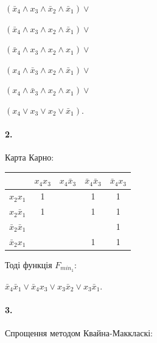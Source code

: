 \documentclass[12pt]{extarticle}
\begin{document}
$( \bar x_4 \land x_3 \land \bar x_2 \land \bar x_1) \lor$

$( \bar x_4 \land x_3 \land x_2 \land \bar x_1) \lor$

$( \bar x_4 \land x_3 \land x_2 \land x_1) \lor$

$( x_4 \land \bar x_3 \land x_2 \land \bar x_1) \lor$

$( x_4 \land \bar x_3 \land x_2 \land x_1) \lor$

$( x_4 \lor x_3 \lor x_2 \lor \bar x_1). $

\paragraph{2.}
Карта Карно:

\begin{center}
    \begin{tabular}{| c | c | c | c | c |}
    \hline
    & $x_4x_3$ & $x_4 \bar x_3$ & $\bar x_4 \bar x_3$ & $\bar x_4x_3$\\
    \hline
    $x_2  x_1$          & 1 &   & 1 & 1\\
    \hline
    $x_2 \bar x_1$      & 1 &   & 1 & 1\\
    \hline
    $\bar x_2 \bar x_1$ &   &   &   & 1\\
    \hline
    $\bar x_2 x_1$      &   &   & 1 & 1\\
    \hline
    \end{tabular}

    
\end{center}
\vspace{12pt}
Тоді функція $F_{min_1}$:

$ \bar x_4 \bar x_1 \lor 
  \bar x_4 x_3 \lor 
   x_3 \bar x_2 \lor 
   x_3 \bar x_1. $

\break
\paragraph{3.}
Спрощення методом Квайна-Маккласкі:
\end{document}
